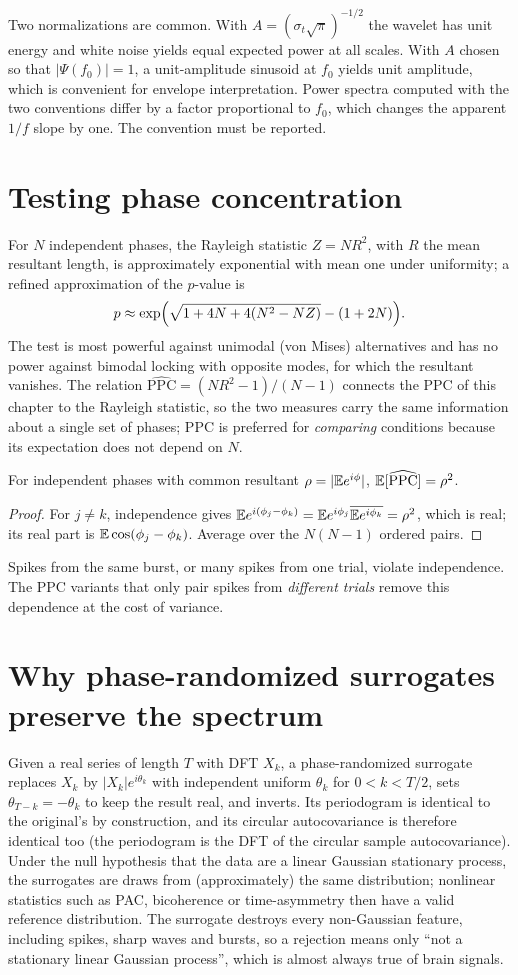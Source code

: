 Two normalizations are common. With $A=(\sigma_t\sqrt{\pi})^{-1/2}$ the
wavelet has unit energy and white noise yields equal expected power at
all scales. With $A$ chosen so that $|\Psi(f_0)|=1$, a unit-amplitude
sinusoid at $f_0$ yields unit amplitude, which is convenient for
envelope interpretation. Power spectra computed with the two conventions
differ by a factor proportional to $f_0$, which changes the apparent
$1/f$ slope by one. The convention must be reported.

\section{Testing phase concentration}
For $N$ independent phases, the Rayleigh statistic $Z=N R^2$, with
$R$ the mean resultant length, is approximately exponential with mean
one under uniformity; a refined approximation of the $p$-value is
\[
p\approx\exp\Bigl(\sqrt{1+4N+4(N^2-NZ)}-(1+2N)\Bigr).
\]
The test is most powerful against unimodal (von Mises) alternatives and
has no power against bimodal locking with opposite modes, for which
the resultant vanishes. The relation $\widehat{\mathrm{PPC}}=(NR^2-1)/(N-1)$
connects the PPC of this chapter to the Rayleigh statistic, so the two
measures carry the same information about a single set of phases; PPC
is preferred for \emph{comparing} conditions because its expectation does
not depend on $N$.

\begin{proposition}
For independent phases with common resultant $\rho=|\mathbb{E} e^{i\phi}|$,
$\mathbb{E}[\widehat{\mathrm{PPC}}]=\rho^2$.
\end{proposition}
\begin{proof}
For $j\ne k$, independence gives
$\mathbb{E} e^{i(\phi_j-\phi_k)}=\mathbb{E} e^{i\phi_j}\overline{\mathbb{E} e^{i\phi_k}}=\rho^2$,
which is real; its real part is $\mathbb{E}\cos(\phi_j-\phi_k)$. Average over the
$N(N-1)$ ordered pairs.
\end{proof}
Spikes from the same burst, or many spikes from one trial, violate
independence. The PPC variants that only pair spikes from \emph{different
trials} remove this dependence at the cost of variance.

\section{Why phase-randomized surrogates preserve the spectrum}
Given a real series of length $T$ with DFT $X_k$, a phase-randomized
surrogate replaces $X_k$ by $|X_k|e^{i\theta_k}$ with independent uniform
$\theta_k$ for $0<k<T/2$, sets $\theta_{T-k}=-\theta_k$ to keep the
result real, and inverts. Its periodogram is identical to the original's
by construction, and its circular autocovariance is therefore identical
too (the periodogram is the DFT of the circular sample autocovariance).
Under the null hypothesis that the data are a linear Gaussian stationary
process, the surrogates are draws from (approximately) the same
distribution; nonlinear statistics such as PAC, bicoherence or
time-asymmetry then have a valid reference distribution. The surrogate
destroys every non-Gaussian feature, including spikes, sharp waves and
bursts, so a rejection means only ``not a stationary linear Gaussian
process'', which is almost always true of brain signals.

